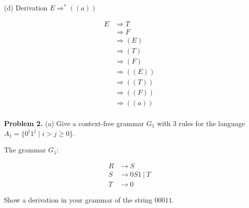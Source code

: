 \documentclass[12pt,letterpaper,final]{report}
\begin{document}
\pagebreak
\noindent(d) Derivation $E \Rightarrow^* ((a))$

\medskip
\noindent
\begin{minipage}[t]{0.35\textwidth}
  \vspace{0pt}
  \begin{align*}
    E & \Rightarrow T     \\
      & \Rightarrow F     \\
      & \Rightarrow (E)   \\
      & \Rightarrow (T)   \\
      & \Rightarrow (F)   \\
      & \Rightarrow ((E)) \\
      & \Rightarrow ((T)) \\
      & \Rightarrow ((F)) \\
      & \Rightarrow ((a)) \\
  \end{align*}
\end{minipage}%
\hfill
\begin{minipage}[t]{0.6\textwidth}
  \vspace{0pt}
  \centering
\end{minipage}

\pagebreak
\textbf{Problem 2.}  (a)  Give a context-free grammar $G_1$ with $3$ rules  for the language $A_1 = \{0^i 1^j \mid i > j \geq 0\}$.

The grammar $G_1$:

\begin{align*}
  R & \to S             \\
  S & \to 0S1\ \vert\ T \\
  T & \to 0\
\end{align*}

Show a derivation in your grammar of the string $00011$.
\end{document}
